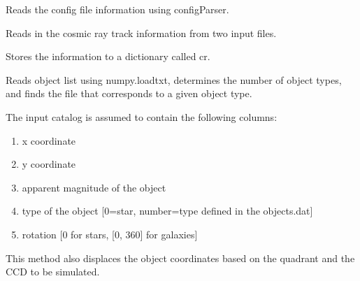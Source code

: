 \documentclass[a4paper,11pt,english]{sphinxmanual}
\begin{document}
\begin{fulllineitems}
\begin{fulllineitems}
\end{fulllineitems}


\begin{fulllineitems}
\label{simulator:simulator.simulator.VISsimulator.readConfigs}
Reads the config file information using configParser.

\end{fulllineitems}


\begin{fulllineitems}
\label{simulator:simulator.simulator.VISsimulator.readCosmicRayInformation}
Reads in the cosmic ray track information from two input files.

Stores the information to a dictionary called cr.

\end{fulllineitems}


\begin{fulllineitems}
\label{simulator:simulator.simulator.VISsimulator.readObjectlist}
Reads object list using numpy.loadtxt, determines the number of object types,
and finds the file that corresponds to a given object type.

The input catalog is assumed to contain the following columns:
\begin{enumerate}
\item {} 
x coordinate

\item {} 
y coordinate

\item {} 
apparent magnitude of the object

\item {} 
type of the object {[}0=star, number=type defined in the objects.dat{]}

\item {} 
rotation {[}0 for stars, {[}0, 360{]} for galaxies{]}

\end{enumerate}

This method also displaces the object coordinates based on the quadrant and the
CCD to be simulated.


\end{fulllineitems}
\end{fulllineitems}
\end{document}
